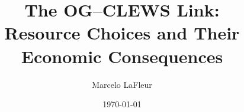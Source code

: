 \documentclass[11pt]{article}
\title{\bfseries The OG--CLEWS Link:\\[2pt]
\large Resource Choices and Their Economic Consequences}
\author{Marcelo LaFleur}
\date{\today}
\begin{document}
\raggedbottom
{}

\maketitle

\begin{abstract}

\end{abstract}







\FloatBarrier




\end{document}

